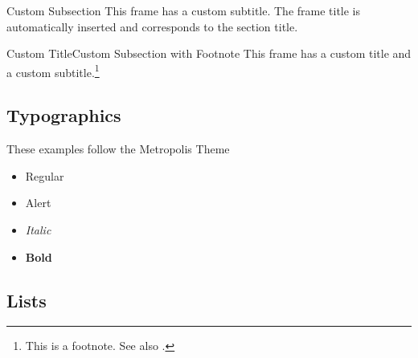 \documentclass[
11pt,notheorems,hyperref={pdfauthor=whatever}
]{beamer}
\begin{document}
\begin{frame}{}{Custom Subsection}
    This frame has a custom subtitle. The frame title is automatically inserted and corresponds to the section title.
\end{frame}

\begin{frame}{Custom Title}{Custom Subsection with Footnote}
    This frame has a custom title and a custom subtitle.\footnote{This is a footnote. See also \textcite{example_2022}. }
\end{frame}

\subsection{Typographics}
\begin{frame}
    These examples follow the Metropolis Theme
    \begin{itemize}
        \item Regular
        \item \alert{Alert}
        \item \textit{Italic}
        \item \textbf{Bold}
    \end{itemize}
\end{frame}

\subsection{Lists}
\end{document}
